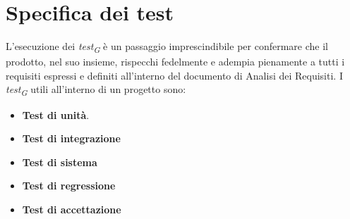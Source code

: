 \section{Specifica dei test}
L'esecuzione dei \textit{test}\textsubscript{\textit{G}} è un passaggio imprescindibile per confermare che il prodotto, nel suo insieme, rispecchi fedelmente e adempia pienamente a tutti i requisiti espressi e definiti all'interno del documento di Analisi dei Requisiti. I \textit{test}\textsubscript{\textit{G}} utili all'interno di un progetto sono:
\begin{itemize}
    \item \textbf{Test di unità}.
    \item \textbf{Test di integrazione}
    \item \textbf{Test di sistema}
    \item \textbf{Test di regressione}
    \item \textbf{Test di accettazione}
\end{itemize}



